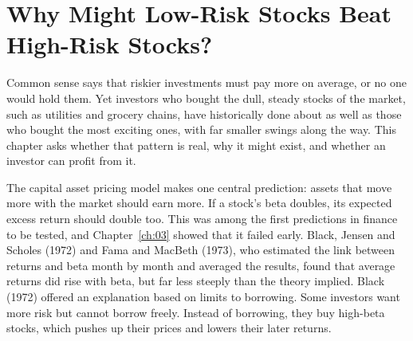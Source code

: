 \makeatletter
{}
\makeatother

\makeatletter
\makeatother

\chapter{Why Might Low-Risk Stocks Beat High-Risk Stocks?}
\label{ch:15}
\providecommand{\term}[1]{\emph{#1}}

Common sense says that riskier investments must pay more on average, or no one would hold them. Yet investors who bought the dull, steady stocks of the market, such as utilities and grocery chains, have historically done about as well as those who bought the most exciting ones, with far smaller swings along the way. This chapter asks whether that pattern is real, why it might exist, and whether an investor can profit from it.

The capital asset pricing model makes one central prediction: assets that move more with the market should earn more. If a stock's beta doubles, its expected excess return should double too. This was among the first predictions in finance to be tested, and Chapter~\ref{ch:03} showed that it failed early. Black, Jensen and Scholes (1972) and Fama and MacBeth (1973), who estimated the link between returns and beta month by month and averaged the results, found that average returns did rise with beta, but far less steeply than the theory implied. Black (1972) offered an explanation based on limits to borrowing. Some investors want more risk but cannot borrow freely. Instead of borrowing, they buy high-beta stocks, which pushes up their prices and lowers their later returns.

